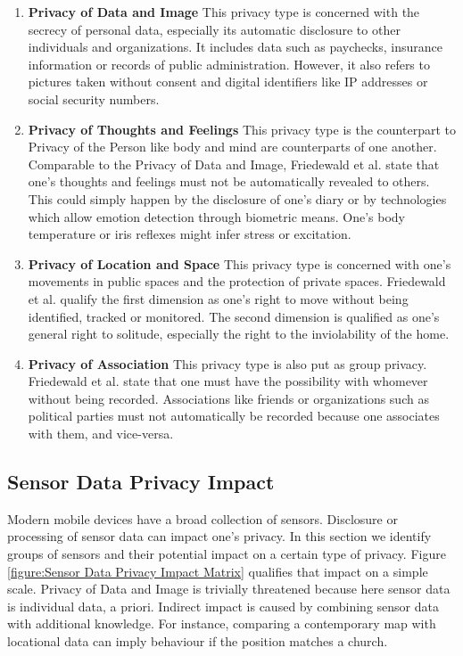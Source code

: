 \documentclass[runningheads,a4paper]{llncs}
\newenvironment{LGContent-Hidden}{ \comment  }{ }
\begin{document}
\begin{LGContent-Hidden}
\begin{enumerate}
\item \textbf{Privacy of Data and Image}
This privacy type is concerned with the secrecy of personal data, especially its automatic disclosure to other individuals and organizations.
It includes data such as paychecks, insurance information or records of public administration.
However, it also refers to pictures taken without consent and digital identifiers like IP addresses or social security numbers.


\item \textbf{Privacy of Thoughts and Feelings}
This privacy type is the counterpart to Privacy of the Person like body and mind are counterparts of one another.
Comparable to the Privacy of Data and Image, Friedewald et al. state that one's thoughts and feelings must not be automatically revealed to others.
This could simply happen by the disclosure of one's diary or by technologies which allow emotion detection through biometric means.
One's body temperature or iris reflexes might infer stress or excitation.


\item \textbf{Privacy of Location and Space}
This privacy type is concerned with one's movements in public spaces and the protection of private spaces.
Friedewald et al. qualify the first dimension as one's right to move without being identified, tracked or monitored.
The second dimension is qualified as one's general right to solitude, especially the right to the inviolability of the home.


\item \textbf{Privacy of Association}
This privacy type is also put as group privacy.
Friedewald et al. state that one must have the possibility with whomever without being recorded.
Associations like friends or organizations such as political parties must not automatically be recorded because one associates with them, and vice-versa.
\end{enumerate}

\end{LGContent-Hidden}


\subsection{Sensor Data Privacy Impact}
\label{sec:SensorPrivacyImpact}

Modern mobile devices have a broad collection of sensors.
Disclosure or processing of sensor data can impact one's privacy.
In this section we identify groups of sensors and their potential impact on a certain type of privacy.
Figure \ref{figure:Sensor Data Privacy Impact Matrix} qualifies that impact on a simple scale.
Privacy of Data and Image is trivially threatened because here sensor data is individual data, a priori.
Indirect impact is caused by combining sensor data with additional knowledge.
For instance, comparing a contemporary map with locational data can imply behaviour if the position matches a church.
\end{document}
